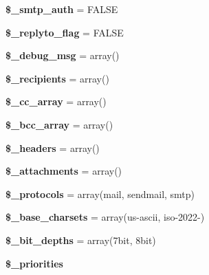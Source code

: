 \begin{DoxyCompactItemize}
\item 
\mbox{\label{class_c_i___email_a40d4d399b6d4b165a7c207978e9adb71}} 
{\bfseries \$\+\_\+smtp\+\_\+auth} = F\+A\+L\+SE
\item 
\mbox{\label{class_c_i___email_aded66d318815ef6fc8afdde6026329db}} 
{\bfseries \$\+\_\+replyto\+\_\+flag} = F\+A\+L\+SE
\item 
\mbox{\label{class_c_i___email_a64709d39bd838c0760f2cc38e5b287c9}} 
{\bfseries \$\+\_\+debug\+\_\+msg} = array()
\item 
\mbox{\label{class_c_i___email_a39123a72ff847b961ec450db96408fa8}} 
{\bfseries \$\+\_\+recipients} = array()
\item 
\mbox{\label{class_c_i___email_a0ed27a9c1b43d0985cef4324091daea1}} 
{\bfseries \$\+\_\+cc\+\_\+array} = array()
\item 
\mbox{\label{class_c_i___email_a27b12c79a1cc2caa8d3642d6546aea01}} 
{\bfseries \$\+\_\+bcc\+\_\+array} = array()
\item 
\mbox{\label{class_c_i___email_a6da77538881ed867dcf470af77d6abb4}} 
{\bfseries \$\+\_\+headers} = array()
\item 
\mbox{\label{class_c_i___email_ac5d381b223334bee29f3b484f15ea671}} 
{\bfseries \$\+\_\+attachments} = array()
\item 
\mbox{\label{class_c_i___email_a676e9da43a8b0d0817b93efa81928b71}} 
{\bfseries \$\+\_\+protocols} = array(\textquotesingle{}mail\textquotesingle{}, \textquotesingle{}sendmail\textquotesingle{}, \textquotesingle{}smtp\textquotesingle{})
\item 
\mbox{\label{class_c_i___email_ae98078c03447b91fe91909552210d264}} 
{\bfseries \$\+\_\+base\+\_\+charsets} = array(\textquotesingle{}us-\/ascii\textquotesingle{}, \textquotesingle{}iso-\/2022-\/\textquotesingle{})
\item 
\mbox{\label{class_c_i___email_a2bc31c6f7a849dc5a3b448048e69b88d}} 
{\bfseries \$\+\_\+bit\+\_\+depths} = array(\textquotesingle{}7bit\textquotesingle{}, \textquotesingle{}8bit\textquotesingle{})
\item 
{\bfseries \$\+\_\+priorities}
\end{DoxyCompactItemize}
